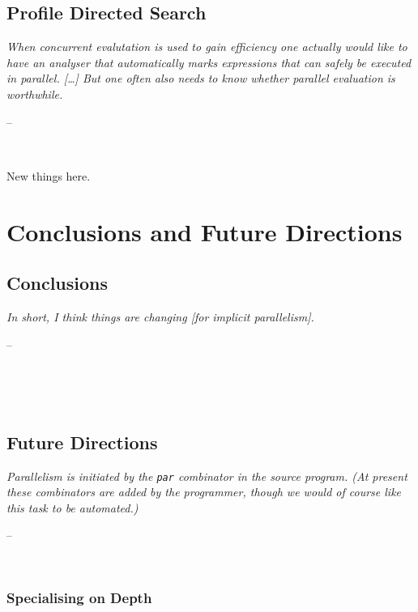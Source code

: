 \documentclass[openright, dottedtoc, headinclude, footinclude=true, a4paper, numbers=noenddot]{scrreprt}
\makeatletter
\newenvironment{chapquote}[2][2em]
  {\setlength{\@tempdima}{#1}%
   \def\chapquote@author{#2}%
   \parshape 1 \@tempdima \dimexpr\textwidth-2\@tempdima\relax%
   \itshape}
  {\par\normalfont\hfill--\ \chapquote@author\hspace*{\@tempdima}\par\noindent\hrulefill\\[1cm]}
\makeatother
\begin{document}
    \chapter{Profile Directed Search}
    \label{chap:prof-search}
    \begin{chapquote}{\cite{dutchBook}}
    When concurrent evalutation is used to gain efficiency one actually would
    like to have an analyser that \emph{automatically} marks expressions that
    can safely be executed in parallel. [\dots] But one often also needs to know whether parallel evaluation
    is \emph{worthwhile}.
    \end{chapquote}
    
        New things here.
        \label{sec:informed-search}
        


\part{Conclusions and Future Directions}
\label{part:conclusion}

    \chapter{Conclusions}
    \label{chap:conclusions}
    \begin{chapquote}{\cite{spjQuote2005}}
     In short, I think things are changing \emph{[for implicit parallelism]}.
    \end{chapquote}
    
    \\[1cm]
    
    
    \chapter{Future Directions}
    \label{chap:future}
    \begin{chapquote}{\cite{trinder1996gum}}
    Parallelism is initiated by the \verb'par' combinator in the source
    program. (At present these combinators are added by the programmer, though
    we would of course like this task to be automated.)
    \end{chapquote}
    
    
        \section{Specialising on Depth}
        \label{sec:specialiseDepth}
        
    
\end{document}

